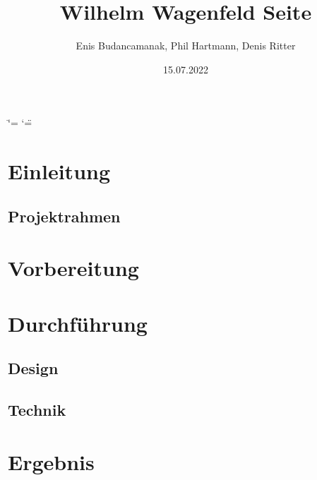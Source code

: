 \documentclass[letterpaper,10pt,ngerman]{sphinxmanual}
\title{Wilhelm Wagenfeld Seite}
\date{15.07.2022}
\author{Enis Budancamanak, Phil Hartmann, Denis Ritter}
\begin{document}
\ifdefined\shorthandoff
  \ifnum\catcode`\=\string=\active\shorthandoff{=}\fi
  \ifnum\catcode`\"=\active{}\fi
\fi

\pagestyle{empty}
\sphinxmaketitle
\pagestyle{plain}
\sphinxtableofcontents
\pagestyle{normal}
\label{\detokenize{index::doc}}


\sphinxstepscope


\chapter{Einleitung}
\label{\detokenize{einleitung:einleitung}}\label{\detokenize{einleitung::doc}}
\sphinxstepscope


\section{Projektrahmen}
\label{\detokenize{projektrahmen:projektrahmen}}\label{\detokenize{projektrahmen::doc}}
\sphinxstepscope


\chapter{Vorbereitung}
\label{\detokenize{vorbereitung:vorbereitung}}\label{\detokenize{vorbereitung::doc}}
\sphinxstepscope


\chapter{Durchführung}
\label{\detokenize{durchf_xfchrung:durchfuhrung}}\label{\detokenize{durchf_xfchrung::doc}}
\sphinxstepscope


\section{Design}
\label{\detokenize{design:design}}\label{\detokenize{design::doc}}
\sphinxstepscope


\section{Technik}
\label{\detokenize{technik:technik}}\label{\detokenize{technik::doc}}
\sphinxstepscope


\chapter{Ergebnis}
\label{\detokenize{ergebnis:ergebnis}}\label{\detokenize{ergebnis::doc}}


\renewcommand{\indexname}{Stichwortverzeichnis}
\printindex
\end{document}
